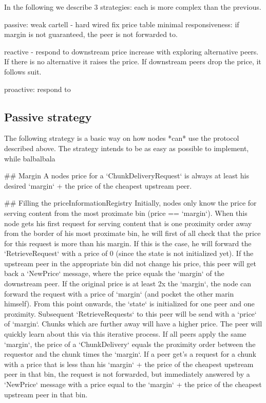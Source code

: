 In the following we describe 3 strategies: each is more complex than the previous.

passive: weak cartell - hard wired fix price table
minimal responsiveness: if margin is not guaranteed, the peer is not forwarded to. 

reactive - respond to downstream price increase with exploring alternative peers. If there is no alternative it raises the price. If downstream peers drop the price, it follows suit.

proactive: respond to 


\subsection{Passive  strategy}\label{sec:pricing-retrieval}
The following strategy is a basic way on how nodes *can* use the protocol described above. The strategy intends to be as easy as possible to implement, while balbalbala

## Margin
A nodes price for a `ChunkDeliveryRequest` is always at least his desired `margin` + the price of the cheapest upstream peer. 

## Filling the priceInformationRegistry
Initially, nodes only know the price for serving content from the most proximate bin (price == `margin`). When this node gets his first request for serving content that is one proximity order away from the border of his most proximate bin, he will first of all check that the price for this request is more than his margin. If this is the case, he will forward the `RetrieveRequest` with a price of 0 (since the state is not initialized yet). If the upstream peer in the appropriate bin did not change his price, this peer will get back a `NewPrice` message, where the price equals the `margin` of the downstream peer. If the original price is at least 2x the `margin`, the node can forward the request with a price of `margin` (and pocket the other marin himself). From this point onwards, the `state` is initialized for one peer and one proximity. Subsequent `RetrieveRequests` to this peer will be send with a `price` of `margin`. Chunks which are further away will have a higher price. The peer will quickly learn about this via this iterative process. If all peers apply the same `margin`, the price of a `ChunkDelivery` equals the proximity order between the requestor and the chunk times the `margin`. If a peer get's a request for a chunk with a price that is less than his `margin` + the price of the cheapest upstream peer in that bin, the request is not forwarded, but immediately answered by a `NewPrice` message with a price equal to the `margin` + the price of the cheapest upstream peer in that bin.

